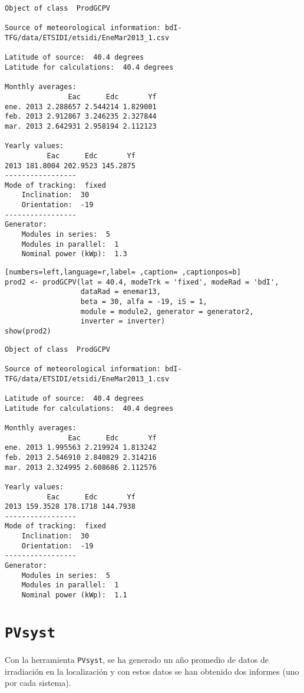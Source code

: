 \begin{verbatim}
Object of class  ProdGCPV 

Source of meteorological information: bdI-TFG/data/ETSIDI/etsidi/EneMar2013_1.csv 

Latitude of source:  40.4 degrees
Latitude for calculations:  40.4 degrees

Monthly averages:
               Eac      Edc       Yf
ene. 2013 2.288657 2.544214 1.829001
feb. 2013 2.912867 3.246235 2.327844
mar. 2013 2.642931 2.958194 2.112123

Yearly values:
          Eac      Edc       Yf
2013 181.8004 202.9523 145.2875
-----------------
Mode of tracking:  fixed 
    Inclination:  30 
    Orientation:  -19 
-----------------
Generator:
    Modules in series:  5 
    Modules in parallel:  1 
    Nominal power (kWp):  1.3
\end{verbatim}

\begin{lstlisting}[numbers=left,language=r,label= ,caption= ,captionpos=b]
prod2 <- prodGCPV(lat = 40.4, modeTrk = 'fixed', modeRad = 'bdI',
                  dataRad = enemar13,
                  beta = 30, alfa = -19, iS = 1,
                  module = module2, generator = generator2,
                  inverter = inverter)
show(prod2)
\end{lstlisting}

\begin{verbatim}
Object of class  ProdGCPV 

Source of meteorological information: bdI-TFG/data/ETSIDI/etsidi/EneMar2013_1.csv 

Latitude of source:  40.4 degrees
Latitude for calculations:  40.4 degrees

Monthly averages:
               Eac      Edc       Yf
ene. 2013 1.995563 2.219924 1.813242
feb. 2013 2.546910 2.840829 2.314216
mar. 2013 2.324995 2.608686 2.112576

Yearly values:
          Eac      Edc       Yf
2013 159.3528 178.1718 144.7938
-----------------
Mode of tracking:  fixed 
    Inclination:  30 
    Orientation:  -19 
-----------------
Generator:
    Modules in series:  5 
    Modules in parallel:  1 
    Nominal power (kWp):  1.1
\end{verbatim}

\section{\texttt{PVsyst}}
\label{sec:org803de5f}
Con la herramienta \texttt{PVsyst}, se ha generado un año promedio de datos de irradiación en la localización y con estos datos se han obtenido dos informes (uno por cada sistema).

